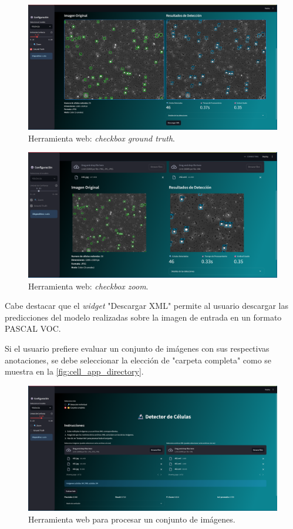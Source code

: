 \documentclass[12pt,a4paper,onecolumn,oneside]{report}
\begin{document}
\begin{figure}[htbp]
  \centering
  \includegraphics[width=1.0\textwidth]{figuras/app/prueba_imagen.png}
  \caption{Herramienta web: \textit{checkbox ground truth}.}
  \label{fig:cell_app_gt}
\end{figure}

\begin{figure}[htbp]
  \centering
  \includegraphics[width=1.0\textwidth]{figuras/app/zoom_imagen.png}
  \caption{Herramienta web: \textit{checkbox zoom}.}
  \label{fig:cell_app_zoom}
\end{figure}

Cabe destacar que el \textit{widget} "Descargar XML" permite al usuario descargar las predicciones del modelo realizadas sobre la imagen de entrada en un formato
PASCAL VOC. 

Si el usuario prefiere evaluar un conjunto de imágenes con sus respectivas anotaciones, se debe seleccionar la elección de "carpeta completa" como se muestra en la \autoref{fig:cell_app_directory}.

\begin{figure}[htbp]
  \centering
  \includegraphics[width=1.0\textwidth]{figuras/app/cell_app_directorio.png}
  \caption{Herramienta web para procesar un conjunto de imágenes.}
  \label{fig:cell_app_directory}
\end{figure}
\end{document}
